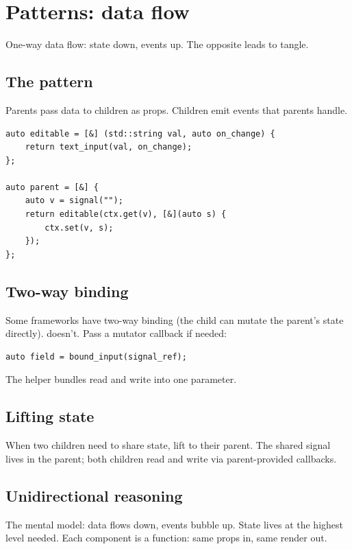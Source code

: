 \chapter{Patterns: data flow}
\label{ch:dataflow}

\begin{aside}
One-way data flow: state down, events up. The opposite leads
to tangle.
\end{aside}

\section{The pattern}

Parents pass data to children as props. Children emit
events that parents handle.

\begin{lstlisting}
auto editable = [&] (std::string val, auto on_change) {
    return text_input(val, on_change);
};

auto parent = [&] {
    auto v = signal("");
    return editable(ctx.get(v), [&](auto s) {
        ctx.set(v, s);
    });
};
\end{lstlisting}

\section{Two-way binding}

Some frameworks have two-way binding (the child can mutate
the parent's state directly). \maya{} doesn't. Pass a
mutator callback if needed:

\begin{lstlisting}
auto field = bound_input(signal_ref);
\end{lstlisting}

The helper bundles read and write into one parameter.

\section{Lifting state}

When two children need to share state, lift to their parent.
The shared signal lives in the parent; both children read
and write via parent-provided callbacks.

\section{Unidirectional reasoning}

The mental model: data flows down, events bubble up. State
lives at the highest level needed. Each component is a
function: same props in, same render out.

